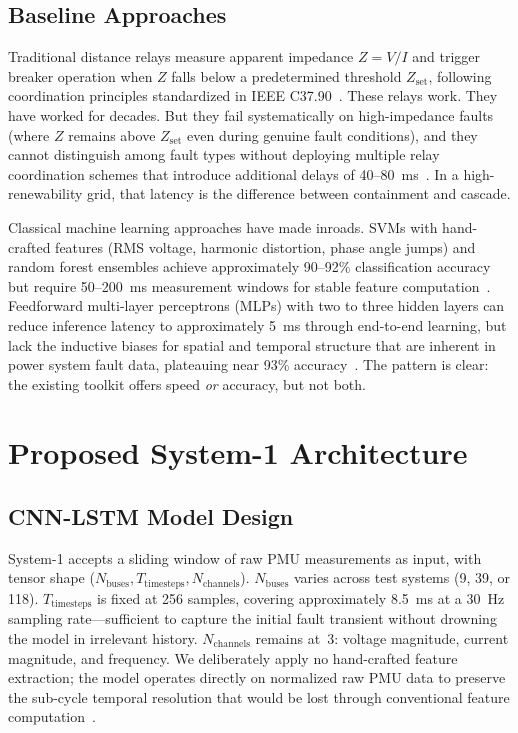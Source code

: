 \documentclass[journal]{IEEEtran}
\begin{document}
\subsection{Baseline Approaches}

Traditional distance relays measure apparent impedance $Z = V/I$ and trigger breaker operation when $Z$ falls below a predetermined threshold $Z_{\text{set}}$, following coordination principles standardized in IEEE C37.90~\cite{ref3}. These relays work. They have worked for decades. But they fail systematically on high-impedance faults (where $Z$ remains above $Z_{\text{set}}$ even during genuine fault conditions), and they cannot distinguish among fault types without deploying multiple relay coordination schemes that introduce additional delays of 40--80~ms~\cite{ref23}. In a high-renewability grid, that latency is the difference between containment and cascade.

Classical machine learning approaches have made inroads. SVMs with hand-crafted features (RMS voltage, harmonic distortion, phase angle jumps) and random forest ensembles achieve approximately 90--92\% classification accuracy but require 50--200~ms measurement windows for stable feature computation~\cite{ref7,ref8}. Feedforward multi-layer perceptrons (MLPs) with two to three hidden layers can reduce inference latency to approximately 5~ms through end-to-end learning, but lack the inductive biases for spatial and temporal structure that are inherent in power system fault data, plateauing near 93\% accuracy~\cite{ref24}. The pattern is clear: the existing toolkit offers speed \emph{or} accuracy, but not both.

\section{Proposed System-1 Architecture}
\label{sec:architecture}

\subsection{CNN-LSTM Model Design}

System-1 accepts a sliding window of raw PMU measurements as input, with tensor shape ($N_{\text{buses}}, T_{\text{timesteps}}, N_{\text{channels}}$). $N_{\text{buses}}$ varies across test systems (9, 39, or 118). $T_{\text{timesteps}}$ is fixed at 256 samples, covering approximately 8.5~ms at a 30~Hz sampling rate---sufficient to capture the initial fault transient without drowning the model in irrelevant history. $N_{\text{channels}}$ remains at~3: voltage magnitude, current magnitude, and frequency. We deliberately apply no hand-crafted feature extraction; the model operates directly on normalized raw PMU data to preserve the sub-cycle temporal resolution that would be lost through conventional feature computation~\cite{ref25}.
\end{document}
